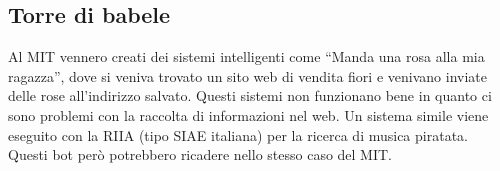 \subsection{Torre di babele}

Al MIT vennero creati dei sistemi intelligenti come ``Manda una rosa alla mia ragazza'', dove si veniva trovato un sito web di vendita fiori e venivano inviate delle rose all'indirizzo salvato. Questi sistemi non funzionano bene in quanto ci sono problemi con la raccolta di informazioni nel web.
Un sistema simile viene eseguito con la RIIA (tipo SIAE italiana) per la ricerca di musica piratata. Questi bot per\`o potrebbero ricadere nello stesso caso del MIT.
